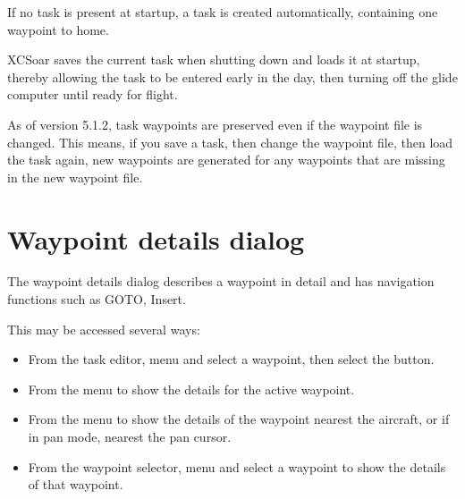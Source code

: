 \documentclass[a4paper,12pt]{refrep}
\begin{document}
\tip If no task is present at startup, a task is created automatically,
  containing one waypoint to home.

XCSoar saves the current task when shutting down and loads it at
startup, thereby allowing the task to be entered early in the day,
then turning off the glide computer until ready for flight.

As of version 5.1.2, task waypoints are preserved even if the waypoint
file is changed.  This means, if you save a task, then change the
waypoint file, then load the task again, new waypoints are generated
for any waypoints that are missing in the new waypoint file.

\section{Waypoint details dialog}

The waypoint details dialog describes a waypoint in detail and has
navigation functions such as GOTO, Insert.

This may be accessed several ways:
\begin{itemize}
\item
From the task editor, menu \blink{} and select
a waypoint, then select the  button.

\item 
From the menu \blink{} to show the
details for the active waypoint.

\item
From the menu \blink{} to show the
details of the waypoint nearest the aircraft, or if in pan mode,
nearest the pan cursor.

\item
From the waypoint selector, menu \blink{} and select a waypoint to show the details of that waypoint.
\end{itemize}
\end{document}

